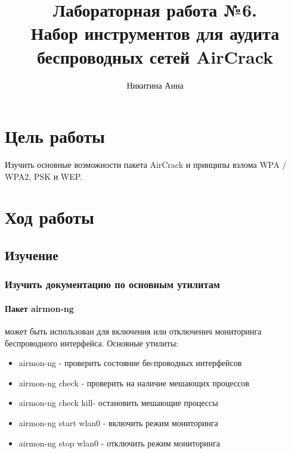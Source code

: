 \documentclass[10pt,a4paper]{report}
\author{Никитина Анна}
\title{Лабораторная работа №6.\\
	Набор инструментов для аудита беспроводных сетей AirCrack}
\begin{document}
\maketitle
\tableofcontents
\pagebreak

\section{Цель работы}
Изучить основные возможности пакета AirCrack и принципы взлома WPA / WPA2, PSK и WEP.
\section{Ход работы}
\subsection{Изучение}
\subsubsection{Изучить документацию по основным утилитам}
\paragraph{Пакет airmon-ng} может быть использован для включения или отключенич мониторинга беспроводного интерфейса.  Основные утилиты: \\
\begin{itemize}
\item airmon-ng - проверить состояние беcпроводных интерфейсов
\item airmon-ng check - проверить на наличие мешающих процессов
\item airmon-ng check kill- остановить мешающие процессы
\item airmon-ng start wlan0 - включить режим мониторинга
\item airmon-ng stop wlan0 - отключить режим мониторинга
\end{itemize} 
\end{document}
